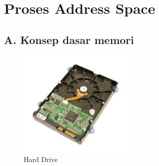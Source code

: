 
\section {Proses Address Space}

\subsection {A. Konsep dasar memori}

\begin{figure}[ht]
\centerline{\includegraphics[width=0.5\textwidth]{figures/drive.jpg}}
\caption{Hard Drive}
\label{Drive}
\end{figure}

